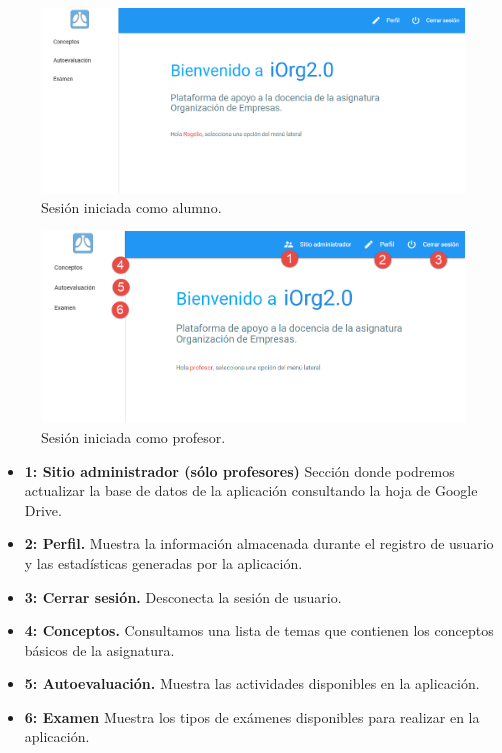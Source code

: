 \begin{figure}[!ht]
  \begin{center}
    \includegraphics[width=1\textwidth]{../images/manual/home_user_alumno.png}
    \caption{Sesión iniciada como alumno.}
    \label{fig:man_home_user_alumno}
  \end{center}
\end{figure}


\begin{figure}[!ht]
  \begin{center}
    \includegraphics[width=1\textwidth]{../images/manual/home_user.png}
    \caption{Sesión iniciada como profesor.}
    \label{fig:man_home_user}
  \end{center}
\end{figure}


\bigskip
 \begin{itemize}
    \item \textbf{1: Sitio administrador (sólo profesores)} Sección donde podremos actualizar la base de datos de la aplicación consultando la hoja de Google Drive.
    \item \textbf{2: Perfil.} Muestra la información almacenada durante el registro de usuario y  las estadísticas generadas por la aplicación.
    \item \textbf{3: Cerrar sesión.} Desconecta la sesión de usuario.
    \item \textbf{4: Conceptos.} Consultamos una lista de temas que contienen los conceptos básicos de la asignatura.
    \item \textbf{5: Autoevaluación.} Muestra las actividades disponibles en la aplicación.
    \item \textbf{6: Examen} Muestra los tipos de exámenes disponibles para realizar en la aplicación.
 \end{itemize}












